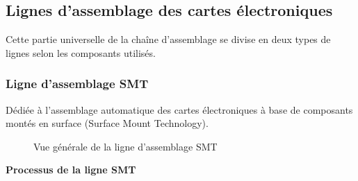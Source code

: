 \subsection{Lignes d'assemblage des cartes électroniques}
\label{subsec:lignes_electroniques}

Cette partie universelle de la chaîne d'assemblage se divise en deux types de lignes selon les composants utilisés.

\subsubsection*{Ligne d'assemblage SMT}

Dédiée à l'assemblage automatique des cartes électroniques à base de composants montés en surface (Surface Mount Technology).

\begin{figure}[H]
    \centering
    \caption{Vue générale de la ligne d'assemblage SMT}
    \label{fig:ligne_smt}
\end{figure}

\textbf{Processus de la ligne SMT}

